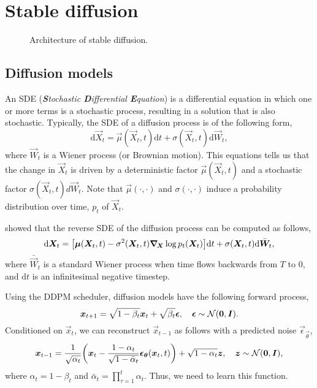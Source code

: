 \section{Stable diffusion}

\begin{figure}
    \centering
    \caption{Architecture of stable diffusion.}
    \label{fig:stable-diffusion-architecture}
\end{figure}

\subsection{Diffusion models}

An SDE (\textit{\textbf{S}tochastic \textbf{D}ifferential \textbf{E}quation}) is a differential
equation in which one or more terms is a stochastic process, resulting in a solution that is also
stochastic. Typically, the SDE of a diffusion process is of the following form, \[
    \mathrm{d}\vec{X}_t = \vec{\mu}(\vec{X}_t, t) \mathrm{d}t + \sigma(\vec{X}_t, t) \mathrm{d}\vec{W}_t,
\]
where $\vec{W}_t$ is a Wiener process (or Brownian motion). This equations tells us that the change
in $\vec{X}_t$ is driven by a deterministic factor $\vec{\mu}(\vec{X}_t,t)$ and a stochastic factor
$\sigma(\vec{X}_t, t) d\vec{W}_t$. Note that $\vec{\mu}(\cdot, \cdot)$ and $\sigma(\cdot, \cdot)$
induce a probability distribution over time, $p_t$ of $\vec{X}_t$.

\citet{anderson1982reverse} showed that the reverse SDE of the diffusion process can be computed as follows, \[
    \mathrm{d}\vec{X}_t = \lft[ \vec{\mu}(\vec{X}_t, t) - \sigma^2(\vec{X}_t, t) \grad{\log p_t(\vec{X}_t)}{\vec{X}} \rgt] \mathrm{d}t + \sigma(\vec{X}_t, t)\mathrm{d}\bar{\vec{W}}_t,
\]
where $\bar{\vec{W}}_t$ is a standard Wiener process when time flows backwards from $T$ to $0$, and
$\mathrm{d}t$ is an infinitesimal negative timestep.

Using the DDPM scheduler, diffusion models have the following forward process, \[
    \bm{x}_{t+1} = \sqrt{1-\beta_t} \bm{x}_t + \sqrt{\beta_t} \bm{\epsilon}, \quad \bm{\epsilon} \sim \mathcal{N}(\bm{0}, \bm{I}).
\]
Conditioned on $\vec{x}_t$, we can reconstruct $\vec{x}_{t-1}$ as follows with a predicted noise
$\vec{\epsilon}_{\vec{\theta}}$,
\begin{equation}
    \label{eq:denoising}
    \vec{x}_{t-1} = \frac{1}{\sqrt{\alpha_t}} \lft( \vec{x}_t - \frac{1-\alpha_t}{\sqrt{1 - \bar{\alpha}_t}} \vec{\epsilon}_{\vec{\theta}}(\vec{x}_t, t) \rgt) + \sqrt{1-\alpha_t} \vec{z}, \quad \vec{z} \sim \mathcal{N}(\vec{0}, \mat{I}),
\end{equation}
where $\alpha_t = 1 - \beta_t$ and $\bar{\alpha}_t = \prod_{\tau=1}^t \alpha_t$. Thus, we need to
learn this function.


